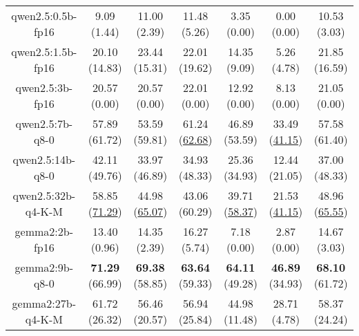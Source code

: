 \begin{table}[hbp]
{\begin{tabular}{ccccccc}
        \multicolumn{1}{c|}{qwen2.5:0.5b-fp16} & 9.09 (1.44) & 11.00 (2.39) & \multicolumn{1}{c|}{11.48 (5.26)} & 3.35 (0.00) & \multicolumn{1}{c|}{0.00 (0.00)} & 10.53 (3.03) \\
        

        \multicolumn{1}{c|}{qwen2.5:1.5b-fp16} & 20.10 (14.83) & 23.44 (15.31) & \multicolumn{1}{c|}{22.01 (19.62)} & 14.35 (9.09) & \multicolumn{1}{c|}{5.26 (4.78)} & 21.85 (16.59) \\
        

        \multicolumn{1}{c|}{qwen2.5:3b-fp16} & 20.57 (0.00) & 20.57 (0.00) & \multicolumn{1}{c|}{22.01 (0.00)} & 12.92 (0.00) & \multicolumn{1}{c|}{8.13 (0.00)} & 21.05 (0.00) \\
        

        \multicolumn{1}{c|}{qwen2.5:7b-q8-0} & 57.89 (61.72) & 53.59 (59.81) & \multicolumn{1}{c|}{61.24 (\underline{62.68})} & 46.89 (53.59) & \multicolumn{1}{c|}{33.49 (\underline{41.15})} & 57.58 (61.40) \\
        

        \multicolumn{1}{c|}{qwen2.5:14b-q8-0} & 42.11 (49.76) & 33.97 (46.89) & \multicolumn{1}{c|}{34.93 (48.33)} & 25.36 (34.93) & \multicolumn{1}{c|}{12.44 (21.05)} & 37.00 (48.33) \\
        

        \multicolumn{1}{c|}{qwen2.5:32b-q4-K-M} & 58.85 (\underline{71.29}) & 44.98 (\underline{65.07}) & \multicolumn{1}{c|}{43.06 (60.29)} & 39.71 (\underline{58.37}) & \multicolumn{1}{c|}{21.53 (\underline{41.15})} & 48.96 (\underline{65.55}) \\
        

        \multicolumn{1}{c|}{gemma2:2b-fp16} & 13.40 (0.96) & 14.35 (2.39) & \multicolumn{1}{c|}{16.27 (5.74)} & 7.18 (0.00) & \multicolumn{1}{c|}{2.87 (0.00)} & 14.67 (3.03) \\
        

        \multicolumn{1}{c|}{gemma2:9b-q8-0} & \textbf{71.29} (66.99) & \textbf{69.38} (58.85) & \multicolumn{1}{c|}{\textbf{63.64} (59.33)} & \textbf{64.11} (49.28) & \multicolumn{1}{c|}{\textbf{46.89} (34.93)} & \textbf{68.10} (61.72) \\
        

        \multicolumn{1}{c|}{gemma2:27b-q4-K-M} & 61.72 (26.32) & 56.46 (20.57) & \multicolumn{1}{c|}{56.94 (25.84)} & 44.98 (11.48) & \multicolumn{1}{c|}{28.71 (4.78)} & 58.37 (24.24) \\
        


\end{tabular}}
\end{table}
